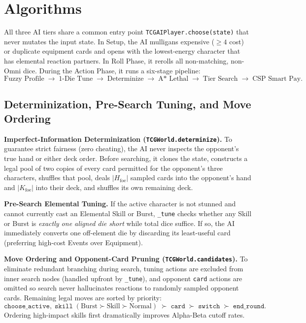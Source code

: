 \documentclass[11pt,a4paper]{article}
\begin{document}
\section{Algorithms}

All three AI tiers share a common entry point \texttt{TCGAIPlayer.choose(state)} that never mutates the input state. In Setup, the AI mulligans expensive ($\ge 4$ cost) or duplicate equipment cards and opens with the lowest-energy character that has elemental reaction partners. In Roll Phase, it rerolls all non-matching, non-Omni dice. During the Action Phase, it runs a six-stage pipeline:
{\small
\[
  \text{Fuzzy Profile} \;\to\; \text{1-Die Tune} \;\to\; \text{Determinize} \;\to\; \text{A* Lethal} \;\to\; \text{Tier Search} \;\to\; \text{CSP Smart Pay}.
\]}

\subsection{Determinization, Pre-Search Tuning, and Move Ordering}

\textbf{Imperfect-Information Determinization (\texttt{TCGWorld.determinize}).} To guarantee strict fairness (zero cheating), the AI never inspects the opponent's true hand or either deck order. Before searching, it clones the state, constructs a legal pool of two copies of every card permitted for the opponent's three characters, shuffles that pool, deals $|H_{\text{foe}}|$ sampled cards into the opponent's hand and $|K_{\text{foe}}|$ into their deck, and shuffles its own remaining deck.

\textbf{Pre-Search Elemental Tuning.} If the active character is not stunned and cannot currently cast an Elemental Skill or Burst, \texttt{\_tune} checks whether any Skill or Burst is \emph{exactly one aligned die short} while total dice suffice. If so, the AI immediately converts one off-element die by discarding its least-useful card (preferring high-cost Events over Equipment).

\textbf{Move Ordering and Opponent-Card Pruning (\texttt{TCGWorld.candidates}).} To eliminate redundant branching during search, tuning actions are excluded from inner search nodes (handled upfront by \texttt{\_tune}), and opponent \texttt{card} actions are omitted so search never hallucinates reactions to randomly sampled opponent cards. Remaining legal moves are sorted by priority:
\[
  \texttt{choose\_active},\;\texttt{skill}\;(\text{Burst} \succ \text{Skill} \succ \text{Normal}) \;\succ\; \texttt{card} \;\succ\; \texttt{switch} \;\succ\; \texttt{end\_round}.
\]
Ordering high-impact skills first dramatically improves Alpha-Beta cutoff rates.
\end{document}
